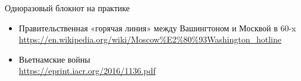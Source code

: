 \documentclass[usenames,dvipsnames,8pt,aspectratio=169]{beamer}
\begin{document}
\begin{frame}{Одноразовый блокнот на практике}
	\Large
	\begin{itemize}
		\itemsep 12pt
		\item Правительственная «горячая линия» между Вашингтоном и Москвой в 60-x\\[4pt]
		\url{https://en.wikipedia.org/wiki/Moscow\%E2\%80\%93Washington_hotline}
		
		\item Вьетнамские войны\\[4pt]
		\url{https://eprint.iacr.org/2016/1136.pdf}
	\end{itemize}
	
\end{frame}
%
%
%	
%	
%
\end{document}
